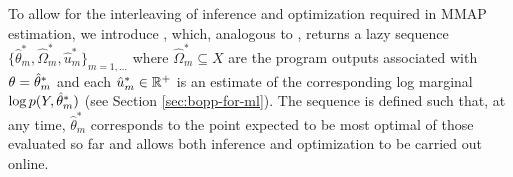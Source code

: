 To allow for the interleaving of inference and optimization required in MMAP estimation, we introduce \doopt, which, analogous to \doquery, returns a lazy sequence $\{\hat{\theta}^*_m,\hat{\Omega}^*_m,\hat{u}^*_m\}_{m=1,\dots}$ where $\hat{\Omega}^*_m \subseteq X$ are the program outputs associated with $\theta=\hat{\theta}^*_m$ and each $\hat{u}^*_m \in \mathbb{R}^+$ is an estimate of the corresponding log marginal $\log p(Y, \hat{\theta}_m^*)$ (see Section \ref{sec:bopp-for-ml}).  The sequence is defined such that, at any time, $\hat{\theta}^*_m$ corresponds to the point expected to be most optimal of those evaluated so far and allows both inference and optimization to be carried out online.
